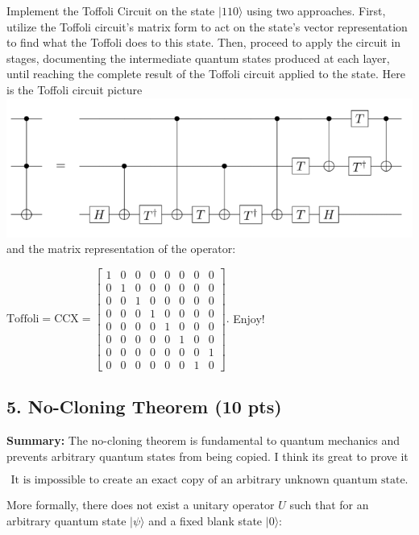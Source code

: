 \documentclass[12pt]{article}
\newcommand{\ket}[1]{| #1 \rangle}
\begin{document}
Implement the Toffoli Circuit on the state $\ket{110}$ using two approaches. First, utilize the Toffoli circuit's matrix form to act on the state's vector representation to find what the Toffoli does to this state. Then, proceed to apply the circuit in stages, documenting the intermediate quantum states produced at each layer, until reaching the complete result of the Toffoli circuit applied to the state. Here is the Toffoli circuit picture
\includegraphics[]{toff.png}
and the matrix representation of the operator:

$\text{Toffoli} = \text{CCX} =
\begin{bmatrix}
1 & 0 & 0 & 0 & 0 & 0 & 0 & 0 \\
0 & 1 & 0 & 0 & 0 & 0 & 0 & 0 \\
0 & 0 & 1 & 0 & 0 & 0 & 0 & 0 \\
0 & 0 & 0 & 1 & 0 & 0 & 0 & 0 \\
0 & 0 & 0 & 0 & 1 & 0 & 0 & 0 \\
0 & 0 & 0 & 0 & 0 & 1 & 0 & 0 \\
0 & 0 & 0 & 0 & 0 & 0 & 0 & 1 \\
0 & 0 & 0 & 0 & 0 & 0 & 1 & 0
\end{bmatrix}.
$
Enjoy!

\subsection*{5. No-Cloning Theorem (10 pts)}

\textbf{Summary:} The no-cloning theorem is fundamental to quantum mechanics and prevents arbitrary quantum states from being copied. I think its great to prove it \smiley{} 

\[
\text{It is impossible to create an exact copy of an arbitrary unknown quantum state.}
\]

More formally, there does not exist a unitary operator \( U \) such that for an arbitrary quantum state \( |\psi\rangle \) and a fixed blank state \( |0\rangle \):
\end{document}
